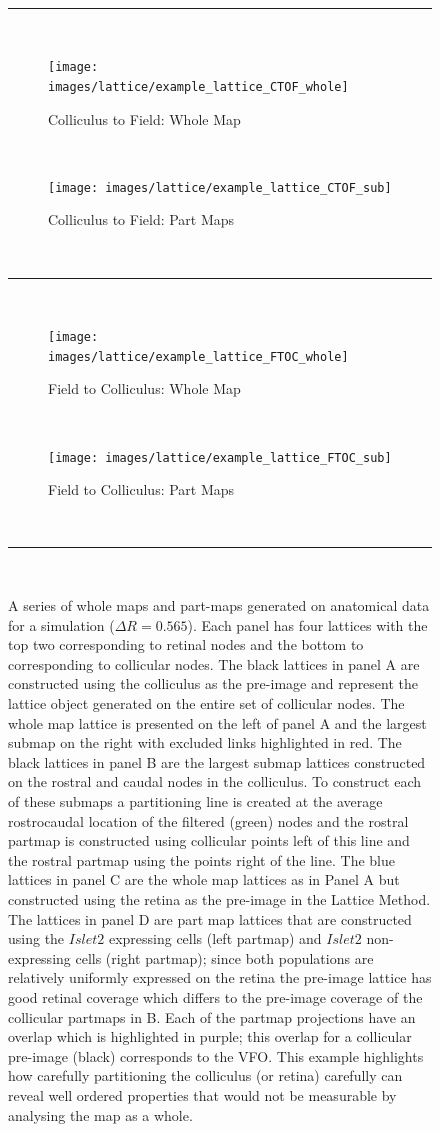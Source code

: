 \begin{figure}[h]
~\unskip\ \vrule\ 
~\unskip\ \hrule width0.985\textwidth
~\unskip\ \vrule\ 
	\begin{subfigure}{0.47\textwidth}
		\caption{Colliculus to Field: Whole Map}
		\centering
		\texttt{[image: images/lattice/example\_lattice\_CTOF\_whole]}
	\end{subfigure}
~\unskip\ \vrule\ 
	\begin{subfigure}{0.47\textwidth}
		\caption{Colliculus to Field: Part Maps}
		\centering
		\texttt{[image: images/lattice/example\_lattice\_CTOF\_sub]}
	\end{subfigure}
~\unskip\ \vrule\ 
~\unskip\ \hrule width0.985\textwidth
~\unskip\ \vrule\ 
	\begin{subfigure}{0.47\textwidth}
		\caption{Field to Colliculus: Whole Map}
		\centering
		\texttt{[image: images/lattice/example\_lattice\_FTOC\_whole]}
	\end{subfigure}
~\unskip\ \vrule\ 
	\begin{subfigure}{0.47\textwidth}
		\caption{Field to Colliculus: Part Maps}
		\centering
		\texttt{[image: images/lattice/example\_lattice\_FTOC\_sub]}
	\end{subfigure}
~\unskip\ \vrule\ 
~\unskip\ \hrule width0.985\textwidth
~\unskip\ \vrule\ 
	\def\c{A series of whole maps and part-maps generated on anatomical data for a simulation ($\Delta R = 0.565$). }
	\caption[\c]{\c Each panel has four lattices with the top two corresponding to retinal nodes and the bottom to corresponding to collicular nodes. The black lattices in panel A are constructed using the colliculus as the pre-image and represent the lattice object generated on the entire set of collicular nodes. The whole map lattice is presented on the left of panel A and the largest submap on the right with excluded links highlighted in red. The black lattices in panel B are the largest submap lattices constructed on the rostral and caudal nodes in the colliculus. To construct each of these submaps a partitioning line is created at the average rostrocaudal location of the filtered (green) nodes and the rostral partmap is constructed using collicular points left of this line and the rostral partmap using the points right of the line. The blue lattices in panel C are the whole map lattices as in Panel A but constructed using the retina as the pre-image in the Lattice Method. The lattices in panel D are part map lattices that are constructed using the $Islet2$ expressing cells (left partmap) and $Islet2$ non-expressing cells (right partmap); since both populations are relatively uniformly expressed on the retina the pre-image lattice has good retinal coverage which differs to the pre-image coverage of the collicular partmaps in B. Each of the partmap projections have an overlap which is highlighted in purple; this overlap for a collicular pre-image (black) corresponds to the VFO. This example highlights how carefully partitioning the colliculus (or retina) carefully can reveal well ordered properties that would not be measurable by analysing the map as a whole. \label{fig:wholemap}}
\end{figure}
\FloatBarrier
